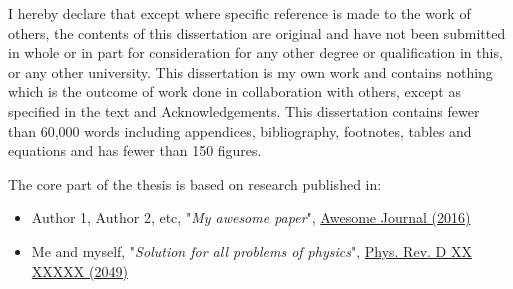 
I hereby declare that except where specific reference is made to the work of others, the contents of this dissertation are original and have not been submitted in whole or in part for consideration for any other degree or qualification in this, or any other university. This dissertation is my own work and contains nothing which is the outcome of work done in collaboration with others, except as specified in the text and Acknowledgements. This dissertation contains fewer than 60,000 words including appendices, bibliography, footnotes, tables and equations and has fewer than 150 figures.

The core part of the thesis is based on research published in:

\begin{itemize}
	\item Author 1, Author 2, etc,
"\emph{My awesome paper}", \href{https://www.google.co.uk/search?q=it+is+a+joke&oq=it+is+a+joke&aqs=chrome.0.69i59.1632j0j8&sourceid=chrome&ie=UTF-8}{Awesome Journal (2016)}

	\item Me and myself,
"\emph{Solution for all problems of physics}", \href{http://i.imgur.com/nuYIk5b.jpg}{Phys. Rev. D XX XXXXX (2049)}
\end{itemize}


